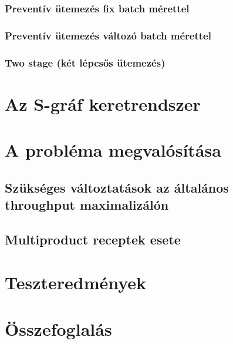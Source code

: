 \documentclass [12pt]{report}
\begin{document}
\subsection{Preventív ütemezés fix batch mérettel}
\subsection{Preventív ütemezés változó batch mérettel}
\subsection{Two stage (két lépcsős ütemezés)}
\chapter{Az S-gráf keretrendszer}
\chapter{A probléma megvalósítása}
\section{Szükséges változtatások az általános throughput maximalizálón} \label{refactor}
\section{Multiproduct receptek esete} \label{extended_multiproduct}
\chapter{Teszteredmények}
\chapter{Összefoglalás}
\end{document}
